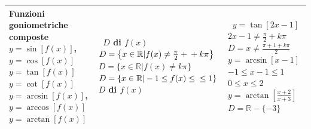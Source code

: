 \begin{tabularx}{\textwidth}{XXX}
  \textbf{Funzioni goniometriche composte} \newline 
\(y=\sin[f(x)]\), \(y=\cos [f(x)]\) \newline \newline \(y=\tan [f(x)]\) \newline 
\newline \newline \(y=\cot [f(x)]\) \newline  \newline \(y=\arcsin[f(x)]\), 
\newline \(y=\arccos [f(x)]\) \newline \newline \(y=\arctan [f(x)]\)
  & \(\,\) \newline \newline \(D\) di \(f(x)\) \newline  \newline 
\(D=\bigl\{x\in\mathbb{R}\vert f(x)\neq\frac{\pi}{2}+\newline+k\pi 
\bigr\}\)\newline \newline \(D=\{x\in\mathbb{R}\vert f(x)\neq k\pi\}\) \newline 
\newline \(D=\{x\in\mathbb{R}\vert -1\leq f(x)\leq\newline\leq1\}\) \newline 
\newline \(D\) di \(f(x)\)
  & \(\,\) \newline \newline \newline \(y=\tan[2x-1]\) \newline 
\(2x-1\neq \frac{\pi}{2}+k\pi\) \newline\(D=x\neq\frac{\pi+1+k\pi}{2}\)  \newline 
\newline \newline  \(y=\arcsin[x-1]\) \newline \(-1\leq x-1\leq1\)\newline \(0\leq 
x\leq2\)\newline \newline\(y=\arctan [\frac{x+2}{x+3}]\) \newline 
\(D=\mathbb{R}-\{-3\}\)
 \\

  \bottomrule
\end{tabularx}

